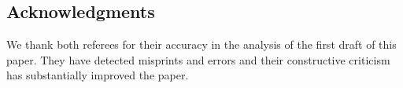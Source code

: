 %
%
%
%
%
%
\subsection*{Acknowledgments}
We thank both referees for their accuracy in the analysis of the first draft of this paper.
They have detected misprints and errors and their constructive criticism has substantially 
improved the paper. 

